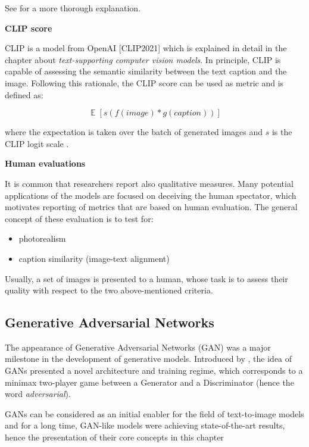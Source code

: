 \documentclass[
]{krantz}
\providecommand{\tightlist}{%
  \setlength{\itemsep}{0pt}\setlength{\parskip}{0pt}}
\begin{document}
See \citet{ImprovedPrecisionRecall2019} for a more thorough explanation.

\textbf{CLIP score}

CLIP is a model from OpenAI {[}CLIP2021{]} which is explained in detail in the chapter about \emph{text-supporting computer vision models}. In principle, CLIP is capable of assessing the semantic similarity between the text caption and the image. Following this rationale, the CLIP score can be used as metric and is defined as:

\[\mathop{{}\mathbb{E}}[s(f(image)*g(caption))]\]

where the expectation is taken over the batch of generated images and \(s\) is the CLIP logit scale \citep{Glide2021}.

\textbf{Human evaluations}

It is common that researchers report also qualitative measures. Many potential applications of the models are focused on deceiving the human spectator, which motivates reporting of metrics that are based on human evaluation. The general concept of these evaluation is to test for:

\begin{itemize}
\tightlist
\item
  photorealism
\item
  caption similarity (image-text alignment)
\end{itemize}

Usually, a set of images is presented to a human, whose task is to assess their quality with respect to the two above-mentioned criteria.

\hypertarget{generative-adversarial-networks}{%
\subsection{Generative Adversarial Networks}\label{generative-adversarial-networks}}

The appearance of Generative Adversarial Networks (GAN) was a major milestone in the development of generative models. Introduced by \citet{GAN2014}, the idea of GANs presented a novel architecture and training regime, which corresponds to a minimax two-player game between a Generator and a Discriminator (hence the word \emph{adversarial}).

GANs can be considered as an initial enabler for the field of text-to-image models and for a long time, GAN-like models were achieving state-of-the-art results, hence the presentation of their core concepts in this chapter
\end{document}
